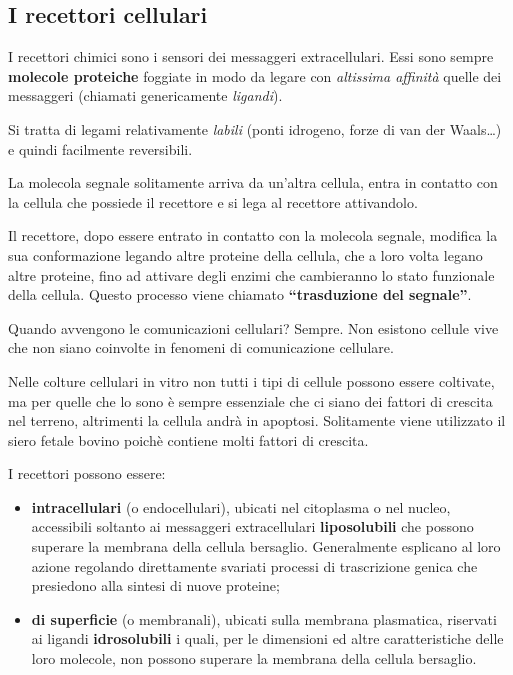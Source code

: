 \documentclass[]{article}
\begin{document}
\subsection{I recettori cellulari}\label{i-recettori-cellulari}

I recettori chimici sono i sensori dei messaggeri extracellulari. Essi
sono sempre \textbf{molecole proteiche} foggiate in modo da legare con
\emph{altissima affinità} quelle dei messaggeri (chiamati genericamente
\emph{ligandi}).

Si tratta di legami relativamente \emph{labili} (ponti idrogeno, forze
di van der Waals\ldots{}) e quindi facilmente reversibili.

La molecola segnale solitamente arriva da un'altra cellula, entra in
contatto con la cellula che possiede il recettore e si lega al recettore
attivandolo.

Il recettore, dopo essere entrato in contatto con la molecola segnale,
modifica la sua conformazione legando altre proteine della cellula, che
a loro volta legano altre proteine, fino ad attivare degli enzimi che
cambieranno lo stato funzionale della cellula. Questo processo viene
chiamato \textbf{``trasduzione del segnale''}.

Quando avvengono le comunicazioni cellulari? Sempre. Non esistono
cellule vive che non siano coinvolte in fenomeni di comunicazione
cellulare.

Nelle colture cellulari in vitro non tutti i tipi di cellule possono
essere coltivate, ma per quelle che lo sono è sempre essenziale che ci
siano dei fattori di crescita nel terreno, altrimenti la cellula andrà
in apoptosi. Solitamente viene utilizzato il siero fetale bovino poichè
contiene molti fattori di crescita.

I recettori possono essere:

\begin{itemize}
\itemsep1pt\parskip0pt
\item
  \textbf{intracellulari} (o endocellulari), ubicati nel citoplasma o
  nel nucleo, accessibili soltanto ai messaggeri extracellulari
  \textbf{liposolubili} che possono superare la membrana della cellula
  bersaglio. Generalmente esplicano al loro azione regolando
  direttamente svariati processi di trascrizione genica che presiedono
  alla sintesi di nuove proteine;
\item
  \textbf{di superficie} (o membranali), ubicati sulla membrana
  plasmatica, riservati ai ligandi \textbf{idrosolubili} i quali, per le
  dimensioni ed altre caratteristiche delle loro molecole, non possono
  superare la membrana della cellula bersaglio.
\end{itemize}
\end{document}
